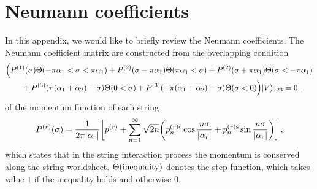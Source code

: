 \documentclass[12pt]{article}
\begin{document}
\appendix
\section{Neumann coefficients}
In this appendix, we would like to briefly review the Neumann
coefficients.
The Neumann coefficient matrix are constructed from the overlapping
condition
\begin{align}
&\Bigl(P^{(1)}(\sigma)\Theta(-\pi\alpha_1<\sigma<\pi\alpha_1)
+P^{(2)}(\sigma-\pi\alpha_1)
\Theta(\pi\alpha_1<\sigma)
+P^{(2)}(\sigma+\pi\alpha_1)
\Theta(\sigma<-\pi\alpha_1)\nonumber\\
&\qquad
+P^{(3)}(\pi(\alpha_1+\alpha_2)-\sigma)\Theta(0<\sigma)
+P^{(3)}(-\pi(\alpha_1+\alpha_2)-\sigma)
\Theta(\sigma<0)\Bigr)|V\rangle_{123}=0\,,
\end{align}
of the momentum function of each string
\begin{align}
P^{(r)}(\sigma)=\frac{1}{2\pi|\alpha_r|}\biggl[p^{(r)}
+\sum_{n=1}^\infty\sqrt{2n}
\biggl(p^{(r){\rm c}}_n\cos\frac{n\sigma}{|\alpha_r|}
+p^{(r){\rm s}}_n\sin\frac{n\sigma}{|\alpha_r|}\biggr)\biggr]\,,
\label{P}
\end{align}
which states that in the string interaction process the momentum is
conserved along the string worldsheet.
$\Theta({\rm inequality})$ denotes the step function, which takes
value $1$ if the inequality holds and otherwise $0$.
\end{document}
